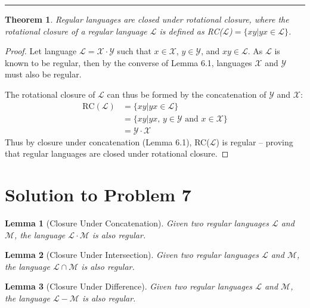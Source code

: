 \documentclass[11pt]{report}
\newcounter{problem}
\theoremstyle{definition}
\theoremstyle{plain}
\newtheorem{lemma}{Lemma}[problem]
\theoremstyle{plain}
\newtheorem{theorem*}{Theorem}
\begin{document}
\hrule

\begin{theorem*}
Regular languages are closed under rotational closure, 
where the rotational closure of a regular language $\mathcal{L}$ is defined as
RC($\mathcal{L}$)$=\{ xy|yx \in \mathcal{L} \}$.
\end{theorem*}

\begin{proof}
Let language $\mathcal{L}=\mathcal{X} \cdot \mathcal{Y}$ 
such that $x \in \mathcal{X}$, $y \in \mathcal{Y}$, and $xy \in \mathcal{L}$. 
As $\mathcal{L}$ is known to be regular, then by the converse of Lemma 6.1, 
languages $\mathcal{X}$ and $\mathcal{Y}$ must also be regular. \newline

\noindent The rotational closure of $\mathcal{L}$ can thus be formed by the 
concatenation of $\mathcal{Y}$ and $\mathcal{X}$:
\begin{align*}
\text{RC}(\mathcal{L}) &= \{ xy|yx \in \mathcal{L} \} \\
&= \{xy|yx \text{, } y \in \mathcal{Y} \text{ and } x \in \mathcal{X}\} \\
&= \mathcal{Y} \cdot \mathcal{X}
\end{align*}
\noindent Thus by closure under concatenation (Lemma 6.1), 
RC($\mathcal{L}$) is regular -- 
proving that regular languages are closed under rotational closure.
\end{proof}

\pagebreak

\section*{Solution to Problem 7}

\begin{lemma}[Closure Under Concatenation]
Given two regular languages $\mathcal{L}$ and $\mathcal{M}$, 
the language $\mathcal{L} \cdot \mathcal{M}$ is also regular. 
\end{lemma}

\begin{lemma}[Closure Under Intersection]
Given two regular languages $\mathcal{L}$ and $\mathcal{M}$, 
the language $\mathcal{L} \cap \mathcal{M}$ is also regular. 
\end{lemma}

\begin{lemma}[Closure Under Difference]
Given two regular languages $\mathcal{L}$ and $\mathcal{M}$, 
the language $\mathcal{L} - \mathcal{M}$ is also regular. 
\end{lemma}
\end{document}
